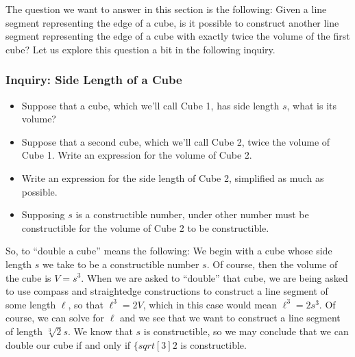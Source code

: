 \documentclass[11pt]{article}
\newenvironment{task}
	{\begin{mdframed}[linecolor=lightgray, linewidth=3pt]\raggedright}
	{\end{mdframed}}
\theoremstyle{definition}
\begin{document}
The question we want to answer in this section is the following: Given a line segment representing the edge of a cube, is it possible 
to construct another line segment representing the edge of a cube with exactly twice the volume of the first cube? Let us explore this
question a bit in the following inquiry.

\subsubsection{Inquiry: Side Length of a Cube}
\begin{task}
  \begin{itemize}
    \item Suppose that a cube, which we'll call Cube 1, has side length $s$, what is its volume?
    \item Suppose that a second cube, which we'll call Cube 2, twice the volume of Cube 1. Write an expression for the volume of Cube 2.
    \item Write an expression for the side length of Cube 2, simplified as much as possible.
    \item Supposing $s$ is a constructible number, under other number must be constructible for the volume of Cube 2 to be constructible.
  \end{itemize}
  
\end{task}

So, to ``double a cube'' means the following: We begin with a cube whose side length $s$ we take to be a constructible number $s$. Of course, 
then the volume of the cube is $V=s^3$. When we are asked to ``double'' that cube, we are being asked to use compass and straightedge 
constructions to construct a line segment of some length $\ell$, so that $\ell^3 = 2V$, which in this case would mean $\ell^3 = 2s^3$. Of 
course, we can solve for $\ell$ and we see that we want to construct a line segment of length $\sqrt[3]{2}s$. We know that $s$ is constructible,
so we may conclude that we can double our cube if and only if $\{sqrt[3]{2}$ is constructible.
\end{document}
